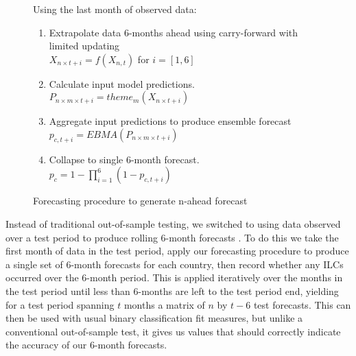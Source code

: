 \documentclass[pdftex,11pt]{article}
\begin{document}
\begin{figure}
\begin{mdframed}[backgroundcolor=black!20,linewidth=0]
\caption{Forecasting procedure to generate n-ahead forecast}
\label{fcast-proc}
\raggedright
Using the last month of observed data:
\begin{enumerate}
\setlength{\itemsep}{-5pt}
\item Extrapolate data 6-months ahead using carry-forward with limited updating \\
$X_{n \times t+i} = f(X_{n, t})$ for  $i = [1, 6]$
\item Calculate input model predictions. \\
$P_{n \times m \times t+i} = theme_m(X_{n \times t+i})$
\item Aggregate input predictions to produce ensemble forecast \\
$p_{c,t+i} = EBMA(P_{n \times m \times t+i})$
\item Collapse to single 6-month forecast. \\ $p_c = 1 - \prod_{i=1}^6(1 - p_{c, t+i})$
\end{enumerate}
\end{mdframed}
\end{figure}

Instead of traditional out-of-sample testing, we switched to using data observed over a test period to produce rolling 6-month forecasts \citep[see also][10]{brandt:freeman:etal:2011}. To do this we take the first month of data in the test period, apply our forecasting procedure to produce a single set of 6-month forecasts for each country, then record whether any ILCs occurred over the 6-month period. This is applied iteratively over the months in the test period until less than 6-months are left to the test period end, yielding for a test period spanning $t$ months a matrix of $n$ by $t-6$ test forecasts. This can then be used with usual binary classification fit measures, but unlike a conventional out-of-sample test, it gives us values that should correctly indicate the accuracy of our 6-month forecasts.  
\end{document}
